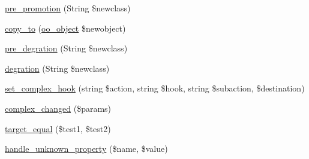 \begin{DoxyCompactItemize}
\item 
\hyperlink{classSunhill_1_1Objects_1_1oo__object_ab7ccff8fa3e57c0bc9298951b9fb4eed}{pre\+\_\+promotion} (String \$newclass)
\item 
\hyperlink{classSunhill_1_1Objects_1_1oo__object_ad99dbeb32a4cdcf768d89709d3ee8ff6}{copy\+\_\+to} (\hyperlink{classSunhill_1_1Objects_1_1oo__object}{oo\+\_\+object} \$newobject)
\item 
\hyperlink{classSunhill_1_1Objects_1_1oo__object_a211152451fe705ec0dbea86737de43a9}{pre\+\_\+degration} (String \$newclass)
\item 
\hyperlink{classSunhill_1_1Objects_1_1oo__object_aef4e3aff41f20415852162c48841b2e9}{degration} (String \$newclass)
\item 
\hyperlink{classSunhill_1_1Objects_1_1oo__object_a25c0435e9d5090099a6688ae2e737b89}{set\+\_\+complex\+\_\+hook} (string \$action, string \$hook, string \$subaction, \$destination)
\item 
\hyperlink{classSunhill_1_1Objects_1_1oo__object_a96cd73bbf482a8f7ffe29b566cb99229}{complex\+\_\+changed} (\$params)
\item 
\hyperlink{classSunhill_1_1Objects_1_1oo__object_a27d18d32512da8fafa7582c89ef7c5a0}{target\+\_\+equal} (\$test1, \$test2)
\item 
\hyperlink{classSunhill_1_1Objects_1_1oo__object_a3cafbef8a2fc2b1b9eff43694a6f51d7}{handle\+\_\+unknown\+\_\+property} (\$name, \$value)
\end{DoxyCompactItemize}
